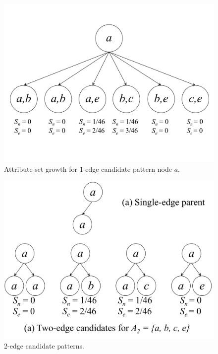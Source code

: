 \begin{figure}[h!]
\centering
    \includegraphics[scale=0.2]{figures/example_1-edge_2-attribute.pdf}
    \caption{Attribute-set growth for 1-edge candidate pattern node $a$.}
    \label{fig:example_1-edge_2-attribute}  
\end{figure}

\begin{figure}[h!]
\centering
    \includegraphics[scale=0.2]{figures/example_2-edge.pdf}
    \caption{2-edge candidate patterns.}
    \label{fig:example_2-edge}  
\end{figure}

